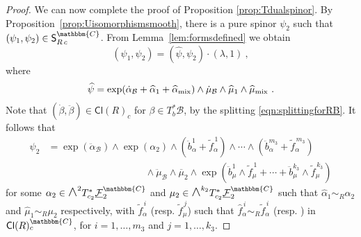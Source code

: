 \documentclass[a4paper, reqno, 11pt]{amsart}
\numberwithin{equation}{section}
\theoremstyle{definition}
\newcommand{\red}[1]{\underline{#1}}
\newcommand{\IC}{\mathbbm{C}}
\newcommand{\Cl}{\mathsf{Cl}}
\newcommand{\cB}{{\mathcal B}}
\newcommand{\cF}{{\mathcal F}}
\newcommand{\sfS}{{\mathsf{S}}}
\newcommand{\midwedge}{\text {\Large$\wedge$}}
\theoremstyle{remark}
\begin{document}
\begin{proof}
We can now complete the proof of Proposition \ref{prop:Tdualspinor}.
By Proposition~\ref{prop:Uisomorphismsmooth}, there is a pure spinor $\psi_{2}$ such that $(\psi_{1}, \psi_{2}) \in \sfS^\IC_{R\,c}$. 
From Lemma~\ref{lem:formsdefined} we obtain $$(\psi_{1},\psi_{2}) = (\widehat \psi , \psi_{2}) \cdot(\lambda,1) \ , $$ where 
\begin{align}
    \widehat \psi = \exp(\dot \alpha_\cB + \widehat\alpha_1 + \widehat \alpha_{\rm mix})\wedge \dot \mu_\cB \wedge \widehat\mu_1 \wedge \widehat \mu_{\rm mix} \ .
\end{align}
Note that $(\dot \beta,\ddot \beta) \in \Cl(R)_c$ for  $\beta \in T_b^*\cB$, by the splitting \eqref{eqn:splittingforRB}.
It follows that
\begin{equation}\label{eqn:tdualcomplexspinor}
\begin{aligned}
    \psi_{2} &= \exp(\ddot \alpha_\cB) \wedge\exp(\alpha_2) \wedge (\ddot b_\alpha^1 + \widetilde f_\alpha^{\,1}) \wedge \cdots \wedge (\ddot b_\alpha^{m_3} + \widetilde f_\alpha^{\,m_3}) \\
    &\qquad \qquad \qquad\qquad\qquad \wedge \ddot\mu_\cB \wedge \overline{\mu}_2 \wedge \exp(\ddot{b}_\mu^1 \wedge \widetilde{f}_\mu^{\,1} + \cdots +\ddot{b}_\mu^{k_3} \wedge \widetilde{f}_\mu^{\,k_3})
\end{aligned}
\end{equation}
for some $\alpha_2\in\midwedge^2 T_{c_2}^*\red\cF{}_2^\IC$ and $\mu_2\in\midwedge^{k_2}T^*_{c_2}\red\cF{}_2^\IC$ such that $\widehat\alpha_1\sim_R\alpha_2$ and $\widehat\mu_1\sim_R\mu_2$ respectively, with $\widetilde f_\alpha^{\,i}$ (resp. $\widetilde f_\mu^{\,j}$) such that $\widehat f_\alpha^{\,i} \sim_R \widetilde f_\alpha^{\,i}$ (resp. ) in $\Cl(R)^\IC_c$, for $i = 1,\ldots, m_3$ and $j = 1, \ldots , k_3$.


\end{proof}
\end{document}

